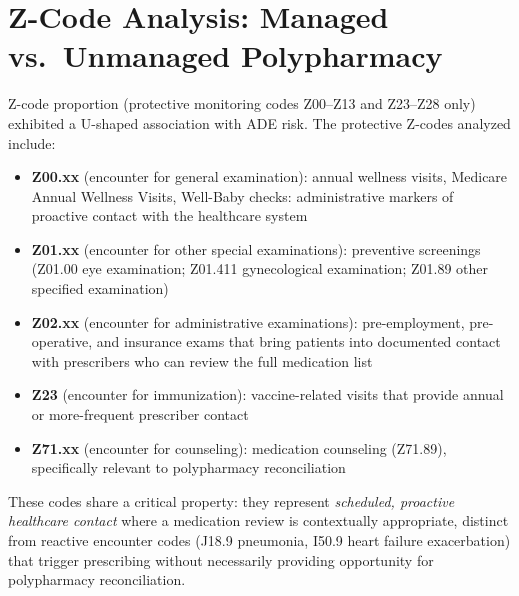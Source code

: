 \documentclass[
  12pt,
]{book}
\providecommand{\tightlist}{%
  \setlength{\itemsep}{0pt}\setlength{\parskip}{0pt}}
\begin{document}
\section{Z-Code Analysis: Managed vs.~Unmanaged
Polypharmacy}\label{sec-zcode}

Z-code proportion (protective monitoring codes Z00--Z13 and Z23--Z28
only) exhibited a U-shaped association with ADE risk. The protective
Z-codes analyzed include:

\begin{itemize}
\tightlist
\item
  \textbf{Z00.xx} (encounter for general examination): annual wellness
  visits, Medicare Annual Wellness Visits, Well-Baby checks:
  administrative markers of proactive contact with the healthcare system
\item
  \textbf{Z01.xx} (encounter for other special examinations): preventive
  screenings (Z01.00 eye examination; Z01.411 gynecological examination;
  Z01.89 other specified examination)
\item
  \textbf{Z02.xx} (encounter for administrative examinations):
  pre-employment, pre-operative, and insurance exams that bring patients
  into documented contact with prescribers who can review the full
  medication list
\item
  \textbf{Z23} (encounter for immunization): vaccine-related visits that
  provide annual or more-frequent prescriber contact
\item
  \textbf{Z71.xx} (encounter for counseling): medication counseling
  (Z71.89), specifically relevant to polypharmacy reconciliation
\end{itemize}

These codes share a critical property: they represent \emph{scheduled,
proactive healthcare contact} where a medication review is contextually
appropriate, distinct from reactive encounter codes (J18.9 pneumonia,
I50.9 heart failure exacerbation) that trigger prescribing without
necessarily providing opportunity for polypharmacy reconciliation.
\end{document}
